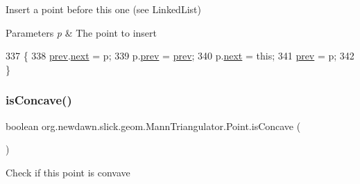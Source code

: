 Insert a point before this one (see Linked\+List)


\begin{DoxyParams}{Parameters}
{\em p} & The point to insert \\
\hline
\end{DoxyParams}

\begin{DoxyCode}
337                                           \{
338             \mbox{\hyperlink{classorg_1_1newdawn_1_1slick_1_1geom_1_1_mann_triangulator_1_1_point_aada0547222c51b32a918839db2eca9f2}{prev}}.\mbox{\hyperlink{classorg_1_1newdawn_1_1slick_1_1geom_1_1_mann_triangulator_1_1_point_a5679974de3d6ea0e554138b1d4e19123}{next}} = p;
339             p.\mbox{\hyperlink{classorg_1_1newdawn_1_1slick_1_1geom_1_1_mann_triangulator_1_1_point_aada0547222c51b32a918839db2eca9f2}{prev}} = \mbox{\hyperlink{classorg_1_1newdawn_1_1slick_1_1geom_1_1_mann_triangulator_1_1_point_aada0547222c51b32a918839db2eca9f2}{prev}};
340             p.\mbox{\hyperlink{classorg_1_1newdawn_1_1slick_1_1geom_1_1_mann_triangulator_1_1_point_a5679974de3d6ea0e554138b1d4e19123}{next}} = \textcolor{keyword}{this};
341             \mbox{\hyperlink{classorg_1_1newdawn_1_1slick_1_1geom_1_1_mann_triangulator_1_1_point_aada0547222c51b32a918839db2eca9f2}{prev}} = p;
342         \}
\end{DoxyCode}
\mbox{\label{classorg_1_1newdawn_1_1slick_1_1geom_1_1_mann_triangulator_1_1_point_a36120f090914969755d93e0c2df0b256}} 
\subsubsection{\texorpdfstring{is\+Concave()}{isConcave()}}
{\footnotesize\ttfamily boolean org.\+newdawn.\+slick.\+geom.\+Mann\+Triangulator.\+Point.\+is\+Concave (\begin{DoxyParamCaption}{ }\end{DoxyParamCaption})\hspace{0.3cm}{\ttfamily [inline]}}

Check if this point is convave

